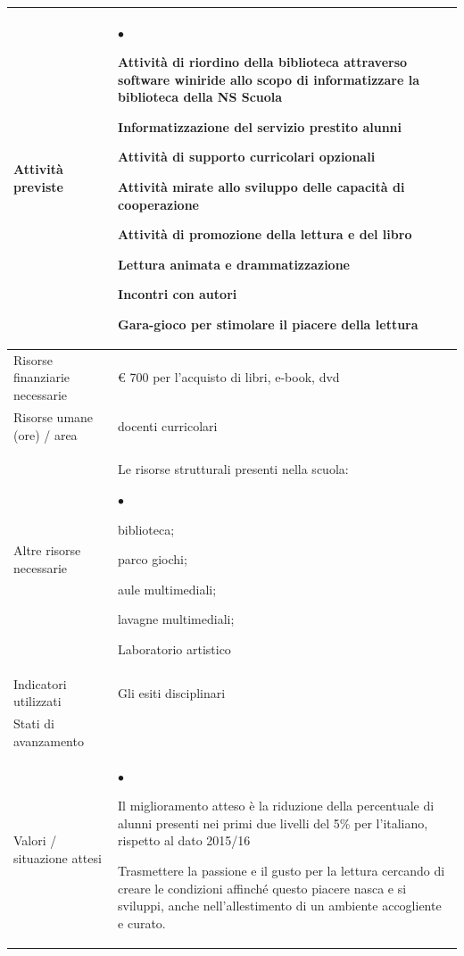 \documentclass[12pt,a4paper,oneside]{memoir}
\newenvironment{elenco}{\begin{list}{$\bullet$}{%
              \setlength{\leftmargin}{4mm}%
              \setlength{\rightmargin}{1mm}%
               \setlength{\itemindent}{0mm}%
               \setlength{\labelwidth}{2mm}%
               \setlength{\labelsep}{2mm}%
              \setlength{\itemsep}{-\parsep}%
              \setlength{\partopsep}{0pt}%
              \setlength{\topsep}{0pt}%
             \setlength{\parskip}{0pt}%
              }}{\end{list}}
\begin{document}
\begin{footnotesize}
\begin{longtable}{|>{\raggedright}p{2.5cm}|>{\raggedright\arraybackslash}P{10cm}|}
Attività previste&
\begin{elenco}
\item Attività di riordino della biblioteca attraverso software winiride allo scopo di informatizzare la biblioteca della NS Scuola
\item Informatizzazione del servizio prestito alunni
\item Attività di supporto curricolari opzionali
\item Attività mirate allo sviluppo delle capacità di cooperazione
\item Attività di promozione della lettura e del libro
\item Lettura animata e drammatizzazione
\item Incontri con autori
\item Gara-gioco per stimolare il piacere della lettura
\end{elenco}\\[-4mm] \hline
Risorse finanziarie necessarie&€ 700 per l'acquisto di libri, e-book, dvd\\ \hline
Risorse umane (ore) / area&docenti curricolari\\ \hline
Altre risorse necessarie&Le risorse strutturali presenti nella scuola:
\begin{elenco} 
\item biblioteca;
\item parco giochi;
\item aule multimediali;
\item lavagne multimediali;
\item Laboratorio artistico
\end{elenco}\\[-4mm] \hline
Indicatori utilizzati &Gli esiti disciplinari \\ \hline
Stati di avanzamento&\\ \hline
Valori / situazione attesi&
\begin{elenco}
\item Il miglioramento atteso è la riduzione della percentuale di alunni presenti nei primi due livelli del 5\% per l'italiano, rispetto al dato 2015/16
\item Trasmettere la passione e il gusto per la lettura cercando di creare le condizioni affinché questo piacere nasca e si sviluppi, anche nell'allestimento di un ambiente accogliente e curato.
\end{elenco}\\ \hline
\end{longtable}
\end{footnotesize}
\end{document}
